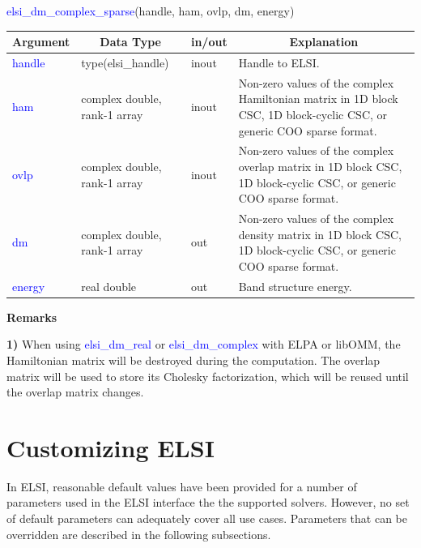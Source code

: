 \documentclass{report}
\begin{document}
\newpage
\begin{labeling}{\hspace{6cm}}
\item [\hspace{0.3cm} \textcolor{blue}{elsi\_dm\_complex\_sparse}(handle, ham, ovlp, dm, energy)]
\end{labeling}

\begin{tabular}[]{|p{20mm}|p{45mm}|p{15mm}|p{85mm}|}
\hline
\multicolumn{1}{|c|}{\textbf{Argument}} & \multicolumn{1}{c|}{\textbf{Data Type}} & \multicolumn{1}{c|}{\textbf{in/out}} & \multicolumn{1}{c|}{\textbf{Explanation}}\\
\hline
\textcolor{blue}{handle} & type(elsi\_handle)           & inout & Handle to ELSI.\\
\hline
\textcolor{blue}{ham}    & complex double, rank-1 array & inout & Non-zero values of the complex Hamiltonian matrix in 1D block CSC, 1D block-cyclic CSC, or generic COO sparse format.\\
\hline
\textcolor{blue}{ovlp}   & complex double, rank-1 array & inout & Non-zero values of the complex overlap matrix in 1D block CSC, 1D block-cyclic CSC, or generic COO sparse format.\\
\hline
\textcolor{blue}{dm}     & complex double, rank-1 array & out   & Non-zero values of the complex density matrix in 1D block CSC, 1D block-cyclic CSC, or generic COO sparse format.\\
\hline
\textcolor{blue}{energy} & real double                  & out   & Band structure energy.\\
\hline
\end{tabular}

\textbf{Remarks}

\textbf{1)} When using \textcolor{blue}{elsi\_dm\_real} or \textcolor{blue}{elsi\_dm\_complex} with ELPA or libOMM, the Hamiltonian matrix will be destroyed during the computation.  The overlap matrix will be used to store its Cholesky factorization, which will be reused until the overlap matrix changes.

\section{Customizing ELSI}
\label{sec:setter}
In ELSI, reasonable default values have been provided for a number of parameters used in the ELSI interface the the supported solvers.  However, no set of default parameters can adequately cover all use cases.  Parameters that can be overridden are described in the following subsections.
\end{document}
